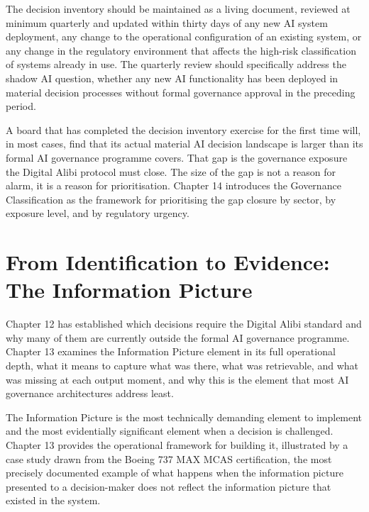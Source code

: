 The decision inventory should be maintained as a living document, reviewed at minimum quarterly and updated within thirty days of any new AI system deployment, any change to the operational configuration of an existing system, or any change in the regulatory environment that affects the high-risk classification of systems already in use. The quarterly review should specifically address the shadow AI question, whether any new AI functionality has been deployed in material decision processes without formal governance approval in the preceding period.

A board that has completed the decision inventory exercise for the first time will, in most cases, find that its actual material AI decision landscape is larger than its formal AI governance programme covers. That gap is the governance exposure the Digital Alibi protocol must close. The size of the gap is not a reason for alarm, it is a reason for prioritisation. Chapter 14 introduces the Governance Classification as the framework for prioritising the gap closure by sector, by exposure level, and by regulatory urgency.

\scenebreak

\section{From Identification to Evidence: The Information Picture}

Chapter 12 has established which decisions require the Digital Alibi standard and why many of them are currently outside the formal AI governance programme. Chapter 13 examines the Information Picture element in its full operational depth, what it means to capture what was there, what was retrievable, and what was missing at each output moment, and why this is the element that most AI governance architectures address least.

The Information Picture is the most technically demanding element to implement and the most evidentially significant element when a decision is challenged. Chapter 13 provides the operational framework for building it, illustrated by a case study drawn from the Boeing 737 MAX MCAS certification, the most precisely documented example of what happens when the information picture presented to a decision-maker does not reflect the information picture that existed in the system.
